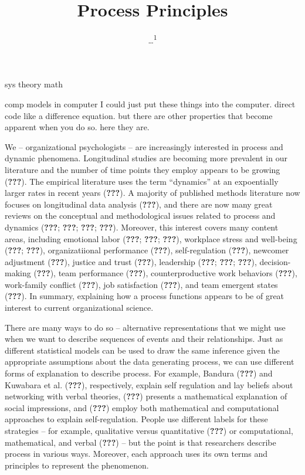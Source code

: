 \documentclass[english,,man]{apa6}
\title{Process Principles}
\author{\ldots{}\textsuperscript{1}}
\date{}
\affiliation{
\vspace{0.5cm}
\textsuperscript{1} ...}
\theoremstyle{definition}
\theoremstyle{definition}
\theoremstyle{definition}
\theoremstyle{remark}
\begin{document}
\maketitle

sys theory math

comp models in computer I could just put these things into the computer.
direct code like a difference equation. but there are other properties
that become apparent when you do so. here they are.

We -- organizational psychologists -- are increasingly interested in
process and dynamic phenomena. Longitudinal studies are becoming more
prevalent in our literature and the number of time points they employ
appears to be growing ({\textbf{???}}). The empirical literature uses
the term \enquote{dynamics} at an expoentially larger rates in recent
years ({\textbf{???}}). A majority of published methods literature now
focuses on longitudinal data analysis ({\textbf{???}}), and there are
now many great reviews on the conceptual and methodological issues
related to process and dynamics ({\textbf{???}}; {\textbf{???}};
{\textbf{???}}; {\textbf{???}}). Moreover, this interest covers many
content areas, including emotional labor ({\textbf{???}};
{\textbf{???}}; {\textbf{???}}), workplace stress and well-being
({\textbf{???}}; {\textbf{???}}), organizatiional performance
({\textbf{???}}), self-regulation ({\textbf{???}}), newcomer adjustment
({\textbf{???}}), justice and trust ({\textbf{???}}), leadership
({\textbf{???}}; {\textbf{???}}; {\textbf{???}}), decision-making
({\textbf{???}}), team performance ({\textbf{???}}), counterproductive
work behaviors ({\textbf{???}}), work-family conflict ({\textbf{???}}),
job satisfaction ({\textbf{???}}), and team emergent states
({\textbf{???}}). In summary, explaining how a process functions appears
to be of great interest to current organizational science.

There are many ways to do so -- alternative representations that we
might use when we want to describe sequences of events and their
relationships. Just as different statistical models can be used to draw
the same inference given the appropriate assumptions about the data
generating process, we can use different forms of explanation to
describe process. For example, Bandura ({\textbf{???}}) and Kuwabara et
al. ({\textbf{???}}), respectively, explain self regulation and lay
beliefs about networking with verbal theories, ({\textbf{???}}) presents
a mathematical explanation of social impressions, and ({\textbf{???}})
employ both mathematical and computational approaches to explain
self-regulation. People use different labels for these strategies -- for
example, qualitative versus quantitative ({\textbf{???}}) or
computational, mathematical, and verbal ({\textbf{???}}) -- but the
point is that researchers describe process in various ways. Moreover,
each approach uses its own terms and principles to represent the
phenomenon.
\end{document}
